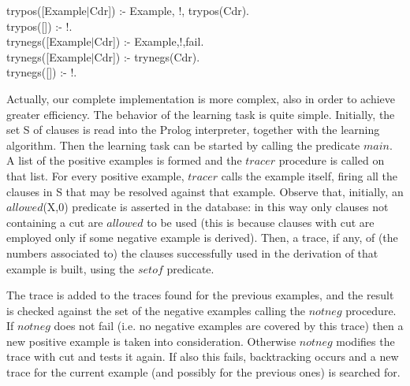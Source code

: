 \noindent
trypos([Example$\mid$Cdr]) :-  Example, !, trypos(Cdr).\\
trypos([]) :- !.\\
 
\noindent
trynegs([Example$\mid$Cdr]) :-  Example,!,fail.\\
trynegs([Example$\mid$Cdr]) :-  trynegs(Cdr). \\
trynegs([]) :- !.\\
\noindent
 
 
\small
\normalsize
 
\noindent
Actually, our complete implementation is more complex, also in order 
to achieve greater efficiency. The behavior of the learning
task is quite simple. Initially, the set S of clauses
is read into the Prolog interpreter, together
with the learning algorithm. Then the learning task can be started by calling
the predicate $main$. A list of the positive examples is formed and 
the $tracer$ procedure is called on that list. For every positive
example, $tracer$ calls the example itself, firing all the clauses
in S that may be resolved against that example. 
Observe that, initially, an $allowed$(X,0) predicate is asserted
in the database: in this way only clauses not
containing a cut are $allowed$ to be used (this is because clauses
with cut are employed only if some negative example is derived).
Then, a trace, if any,
of (the numbers associated to)
the clauses successfully used in the derivation of that example is built,
using the $setof$ predicate.
 
The trace is added to the traces
found for the previous examples, and the result
is checked against the set of
the negative examples calling the $notneg$ procedure. If $notneg$ does not
fail (i.e. no negative examples are covered by this trace) then a new positive
example is taken into consideration. Otherwise 
$notneg$ modifies the trace with cut and tests it again. If also this fails,
backtracking occurs and a new trace for the current example 
(and possibly for the previous ones) is searched for.
 
